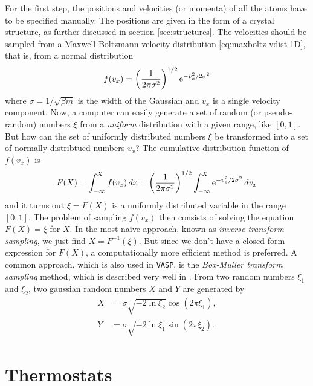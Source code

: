 \documentclass[11pt,bibliography=totoc,index=totoc]{scrbook}   %
\newcommand{\vasp}{{\texttt{VASP}}} %
\begin{document}
For the first step, the positions and velocities (or momenta) of all the atoms have to be specified manually. 
The positions are given in the form of a crystal structure, as further discussed in section \ref{sec:structures}.
The velocities should be sampled from a Maxwell-Boltzmann velocity distribution \eqref{eq:maxboltz-vdist-1D},
that is, from a normal distribution
\begin{equation}
    f(v_x) = \left(\frac{1}{2\pi\sigma^2}\right)^{1/2} \mathrm{e}^{-v_x^2/2\sigma^2}
  \label{eq:normal-dist}
\end{equation}
where $\sigma=1/\sqrt{\beta m}$ is the width of the Gaussian and $v_x$ is a single velocity component.
Now, a computer can easily generate a set of random (or pseudo-random) numbers $\xi$ from a \emph{uniform} distribution with a given range, like $[0,1]$.
But how can the set of uniformly distributed numbers $\xi$ be transformed into a set of normally distribtued numbers $v_x$?
The cumulative distribution function of $f(v_x)$ is
\begin{equation}
    F(X) = \int_{-\infty}^X f(v_x)\,dx = \left(\frac{1}{2\pi\sigma^2}\right)^{1/2} \int_{-\infty}^X \mathrm{e}^{-v_x^2/2\sigma^2} \,dv_x
    \label{eq:CDF}
\end{equation}
and it turns out $\xi = F(X)$ is a uniformly distributed variable in the range $[0,1]$. 
The problem of sampling $f(v_x)$ then consists of solving the equation $F(X)=\xi$ for $X$.
In the most naïve approach, known as \emph{inverse transform sampling}, we just find $X=F^{-1}(\xi)$.
But since we don't have a closed form expression for $F(X)$, a computationally more efficient method is preferred. 
A common approach, which is also used in {\vasp}, %
is the \emph{Box-Muller transform sampling} method, which is
described very well in \cite[101]{Tuckerman:2010}. 
From two random numbers $\xi_1$ and $\xi_2$, two gaussian random numbers $X$ and $Y$ are generated by
\begin{align}
    X &= \sigma \sqrt{-2\ln\xi_2} \cos(2\pi\xi_1), \\
    Y &= \sigma \sqrt{-2\ln\xi_1} \sin(2\pi\xi_2).
  \label{eq:box-muller-sampling}
\end{align}


%
\section{Thermostats}
%
\end{document}
